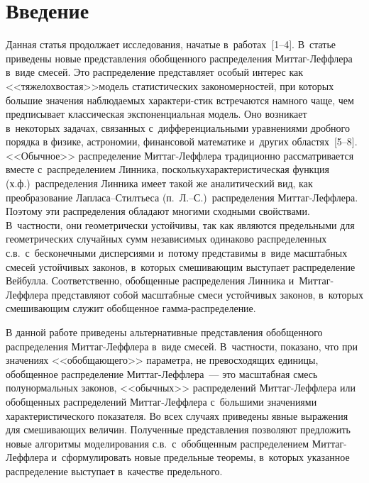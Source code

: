 
  



\thispagestyle{headings}

\begin{multicols}{2}

\label{st\stat}

\section{Введение}

Данная статья продолжает исследования, начатые в~работах~[1--4]. В~статье 
приведены новые представления обобщенного распределения Мит\-таг-Леф\-фле\-ра 
в~виде смесей. Это распределение представляет особый интерес как 
<<тяжелохвостая>>\linebreak модель статистических закономерностей, при которых 
большие значения наблюдаемых характери-\linebreak стик встречаются намного 
чаще, чем предписывает классическая экспоненциальная модель. Оно возникает 
в~некоторых задачах, связанных с~дифференциальными уравнениями дробного порядка 
в физике, астрономии, финансовой математике и~других областях~[5--8]. 
<<Обычное>> распределение Мит\-таг-Леф\-фле\-ра традиционно рассматривается 
вместе с~распределением Линника, поскольку\linebreak характеристическая функция 
(х.ф.)\ распределения Линника имеет такой же аналитический вид, как 
преобразование Лап\-ла\-са--Стилть\-еса (п.~Л.--С.)\ распределения 
Мит\-таг-Леф\-фле\-ра. Поэтому эти распределения обладают многими сходными 
свойствами. В~частности, они геометрически устойчивы, так как являются 
предельными для геометрических случайных сумм независимых одинаково 
распределенных с.в.\ с~бесконечными дисперсиями и~потому представимы в~виде 
масштабных смесей устойчивых законов, в~которых смешивающим выступает 
распределение Вейбулла. Соответственно, обоб\-щен\-ные распределения Линника 
и~Мит\-таг-Леф\-фле\-ра представляют собой масштабные смеси устойчивых законов, 
в~которых смешивающим служит обобщенное гам\-ма-рас\-пре\-де\-ление.

В данной работе приведены альтернативные представления обобщенного
распределения Мит\-таг-Леф\-фле\-ра в~виде смесей. В~частности, показано,
что при значениях <<обобщающего>> параметра, не превосходящих
единицы, обобщенное распределение Мит\-таг-Леф\-фле\-ра~--- это масштабная смесь полунормальных законов, <<обычных>> распределений Миттаг-Леффлера или
обобщенных распределений Мит\-таг-Леф\-фле\-ра с~б$\acute{\mbox{о}}$льшими значениями
характеристического показателя. Во всех случаях приведены явные
выражения для смешивающих величин. Полученные представления
позволяют предложить новые алгоритмы моделирования с.в.\
с~обобщенным распределением Мит\-таг-Леф\-фле\-ра и~сформулировать новые
предельные теоремы, в~которых указанное распределение выступает 
в~качестве предельного.


\end{multicols}
